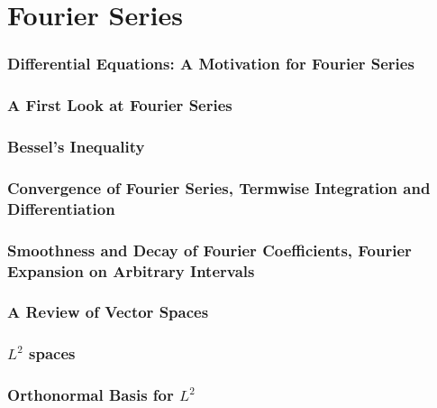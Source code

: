 \part{Fourier Series}
\section{Differential Equations: A Motivation for Fourier Series}

\section{A First Look at Fourier Series}

\section{Bessel's Inequality}

\section[Convergence, Termwise Calculus]{Convergence of Fourier Series, Termwise Integration and Differentiation}

\section[Decay of Coefficients, Arbitrary Intervals]{Smoothness and Decay of Fourier Coefficients, Fourier Expansion on Arbitrary Intervals}

\section{A Review of Vector Spaces}


\section{$L^{2}$ spaces}

\section{Orthonormal Basis for $L^2$}

